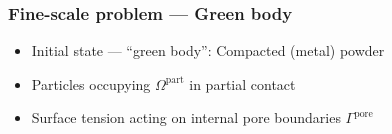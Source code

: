\documentclass[11pt]{beamer} %
\newcommand{\pore}{\mathrm{pore}}
\newcommand{\particle}{\mathrm{part}}
\begin{document}
\begin{frame}
 \frametitle{Fine-scale problem --- Green body}


 \begin{itemize}
  \item Initial state --- ``green body'': Compacted (metal) powder
  \item Particles occupying $\Omega^\particle$ in partial contact
  \item Surface tension acting on internal pore boundaries $\Gamma^\pore$
 \end{itemize}
\end{frame}
\end{document}
